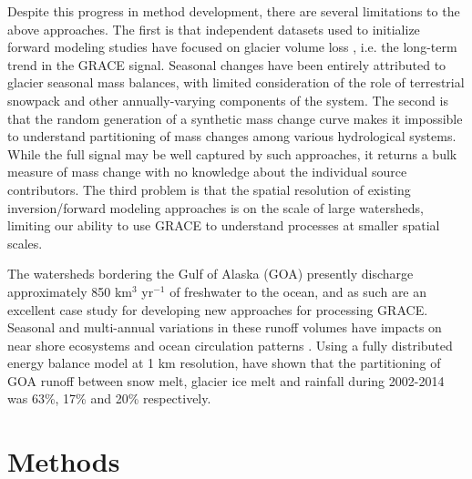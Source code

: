\documentclass[review,oneside]{igs}
\begin{document}
Despite this progress in method development, there are several limitations to the above approaches. The first is that independent datasets used to initialize forward modeling studies have focused on glacier volume loss \citep[e.g.][]{sasgen_towards_2012}, i.e. the long-term trend in the GRACE signal. Seasonal changes have been entirely attributed to glacier seasonal mass balances, with limited consideration of the role of terrestrial snowpack and other annually-varying components of the system. The second is that the random generation of a synthetic mass change curve makes it impossible to understand partitioning of mass changes among various hydrological systems. While the full signal may be well captured by such approaches, it returns a bulk measure of mass change with no knowledge about the individual source contributors. The third problem is that the spatial resolution of existing inversion/forward modeling approaches is on the scale of large watersheds, limiting our ability to use GRACE to understand processes at smaller spatial scales.

The watersheds bordering the Gulf of Alaska (GOA) presently discharge approximately 850 km$^3$ yr$^{-1}$ \citep{hill_spatial_2015} of freshwater to the ocean, and as such are an excellent case study for developing new approaches for processing GRACE. Seasonal and multi-annual variations in these runoff volumes have impacts on near shore ecosystems and ocean circulation patterns \citep{oneel_icefield--ocean_2015}. Using a fully distributed energy balance model at 1 km resolution, \cite{beamer_high-resolution_2016} have shown that the partitioning of GOA runoff between snow melt, glacier ice melt and rainfall during 2002-2014 was 63\%, 17\% and 20\% respectively. 




\citep{lenaerts_irreversible_2013}

\section{Methods}
\end{document}
